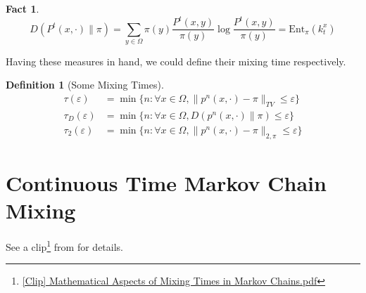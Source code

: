 \documentclass{article}
\newtheorem{define}{Definition}[section]
\newtheorem{fact}{Fact}[section]
\begin{document}
\begin{fact}
  \[D(P^t(x, \cdot) \parallel \pi) =\sum_{y\in \Omega}\pi(y)\frac{P^t(x, y)}{\pi(y)}\log \frac{P^t(x,y)}{\pi(y)} = \mathrm{Ent}_\pi (k^x_t)\]
\end{fact}

Having these measures in hand, we could define their mixing time respectively.

\begin{define}[Some Mixing Times]
  \begin{align*}
    \tau(\varepsilon) &= \min\{n: \forall x\in \Omega, \parallel p^n(x,\cdot) - \pi \parallel_{TV} \leq \varepsilon\} \\
    \tau_D(\varepsilon) &= \min\{n: \forall x\in \Omega, D(p^n(x,\cdot) \parallel \pi) \leq \varepsilon\} \\
    \tau_2(\varepsilon) &= \min\{n: \forall x\in \Omega, \parallel p^n(x,\cdot) - \pi \parallel_{2, \pi} \leq \varepsilon\} 
  \end{align*}
\end{define}

\section{Continuous Time Markov Chain Mixing}
See a clip\footnote{\href{file://./[Clip] Mathematical Aspects of Mixing Times in Markov Chains.pdf}{[Clip] Mathematical Aspects of Mixing Times in Markov Chains.pdf}} from \cite{montenegro2006mathematical} for details.

\clearpage


\end{document}
